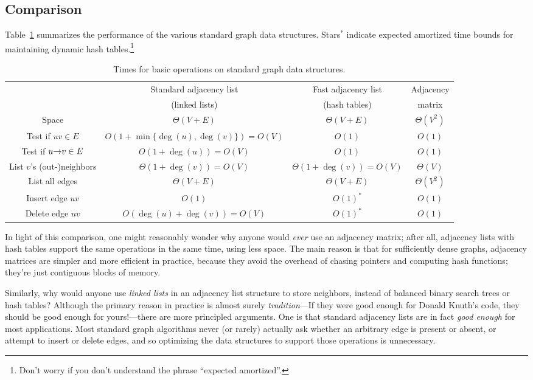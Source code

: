 \subsection{Comparison}

Table~\ref{tab:5.1} summarizes the performance of the various standard graph data structures.
Stars$^*$ indicate expected amortized time bounds for maintaining dynamic hash tables.\footnote{Don’t worry if you don’t understand the phrase “expected amortized”.}

\begin{table}[ht]
\centering
\sffamily\fontsize{7.2}{11.3}\selectfont
\begin{tabular}{c|c|c|c}
& Standard adjacency list & Fast adjacency list & Adjacency\\
& (linked lists) & (hash tables) & matrix\\
\hline
Space & $\Theta(V + E)$ & $\Theta(V + E)$ & $\Theta(V^2)$\\
\hline
Test if $uv \in E$ & $O(1 + \min\{\deg(u), \deg(v)\}) = O(V)$ & $O(1)$ & $O(1)$\\
Test if $u\mathord{\rightarrow}v \in E$ & $O(1 + \deg(u)) = O(V)$ & $O(1)$ & $O(1)$\\
List $v$’s (out-)neighbors & $\Theta(1 + \deg(v)) = O(V)$ & $\Theta(1 + \deg(v)) = O(V)$ & $\Theta(V)$\\
List all edges & $\Theta(V + E)$ & $\Theta(V + E)$ & $\Theta(V^2)$\\
Insert edge $uv$ & $O(1)$ & $O(1)^*$ & $O(1)$\\
Delete edge $uv$ & $O(\deg(u) + \deg(v)) = O(V)$ & $O(1)^*$ & $O(1)$
\end{tabular}
\caption{Times for basic operations on standard graph data structures.}
\label{tab:5.1}
\end{table}

In light of this comparison, one might reasonably wonder why anyone would \textit{ever} use an adjacency matrix; after all, adjacency lists with hash tables support the same operations in the same time, using less space.
The main reason is that for sufficiently dense graphs, adjacency matrices are simpler and more efficient in practice, because they avoid the overhead of chasing pointers and computing hash functions; they’re just contiguous blocks of memory.

Similarly, why would anyone use \textit{linked lists} in an adjacency list structure to store neighbors, instead of balanced binary search trees or hash tables?
Although the primary reason in practice is almost surely \textit{tradition}---If they were good enough for Donald Knuth’s code, they should be good enough for yours!---there are more principled arguments.
One is that standard adjacency lists are in fact \textit{good enough} for most applications.
Most standard graph algorithms never (or rarely) actually ask whether an arbitrary edge is present or absent, or attempt to insert or delete edges, and so optimizing the data structures to support those operations is unnecessary.

